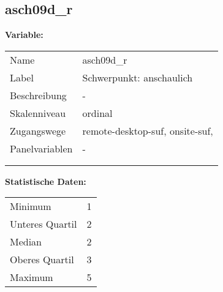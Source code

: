 	
	
	\subsection{asch09d\_r}
	\label{subSection:asch09d_r}

	\noindent\textbf{Variable:}\\
		\begin{tabular}{lL{11.3cm}}
			\label{tableVariable:asch09d_r}
			Name & asch09d\_r \\
			Label & Schwerpunkt: anschaulich \\
			Beschreibung & - \\
			Skalenniveau & ordinal \\
			Zugangswege &
				remote-desktop-suf,
				onsite-suf,
 \\
			Panelvariablen & -
			 \\
			 \\
 \\
		\end{tabular}



		\vspace*{1 cm}
		\noindent\textbf{Statistische Daten:}\\
			\begin{tabular}{ll}
				\label{tableStatistics:asch09d_r}
					Minimum & 1 \\
					Unteres Quartil & 2 \\
					Median & 2 \\
					Oberes Quartil & 3 \\
					Maximum & 5 \\
			\end{tabular}



